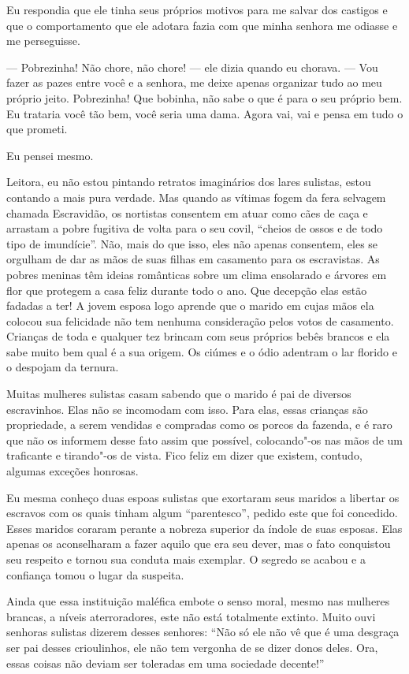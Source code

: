 Eu respondia que ele tinha seus próprios motivos para me salvar dos
castigos e que o comportamento que ele adotara fazia com que minha
senhora me odiasse e me perseguisse.

--- Pobrezinha! Não chore, não chore! --- ele dizia quando eu chorava.
--- Vou fazer as pazes entre você e a senhora, me deixe apenas organizar
tudo ao meu próprio jeito. Pobrezinha! Que bobinha, não sabe o que é
para o seu próprio bem. Eu trataria você tão bem, você seria uma dama.
Agora vai, vai e pensa em tudo o que prometi.

Eu pensei mesmo.

Leitora, eu não estou pintando retratos
imaginários dos lares sulistas, estou contando a mais pura verdade.
Mas quando as vítimas fogem da
fera selvagem chamada Escravidão, os nortistas consentem em atuar como
cães de caça e arrastam a pobre fugitiva de volta para o seu covil,
``cheios de ossos e de todo tipo de imundície''. Não, mais do que isso,
eles não apenas consentem, eles se orgulham de dar as mãos de suas
filhas em casamento para os escravistas. As pobres meninas têm ideias
românticas sobre um clima ensolarado e árvores em flor que protegem a
casa feliz durante todo o ano. Que decepção elas estão fadadas a ter! A
jovem esposa logo aprende que o marido em cujas mãos ela colocou sua
felicidade não tem nenhuma consideração pelos votos de casamento.
Crianças de toda e qualquer tez brincam com seus próprios bebês brancos
e ela sabe muito bem qual é a sua origem. Os ciúmes e o ódio adentram o
lar florido e o despojam da ternura.

Muitas mulheres sulistas casam sabendo
que o marido é pai de diversos escravinhos. Elas não se incomodam com
isso. Para elas, essas crianças são propriedade, a serem vendidas e
compradas como os porcos da fazenda, e é raro que não os informem desse
fato assim que possível, colocando"-os nas mãos de um traficante e
tirando"-os de vista. Fico feliz em dizer que existem, contudo, algumas
exceções honrosas.

Eu mesma conheço duas espoas sulistas
que exortaram seus maridos a libertar os escravos com os quais tinham
algum ``parentesco'', pedido este que foi concedido. Esses maridos
coraram perante a nobreza superior da índole de suas esposas. Elas
apenas os aconselharam a fazer aquilo que era seu dever, mas o fato
conquistou seu respeito e tornou sua conduta mais exemplar. O segredo se
acabou e a confiança tomou o lugar da suspeita.

Ainda que essa instituição maléfica
embote o senso moral, mesmo nas mulheres brancas, a níveis
aterroradores, este não está totalmente extinto. Muito ouvi senhoras
sulistas dizerem desses senhores: ``Não só ele não vê que é uma desgraça
ser pai desses crioulinhos, ele não tem vergonha de se dizer donos
deles. Ora, essas coisas não deviam ser toleradas em uma sociedade
decente!''

